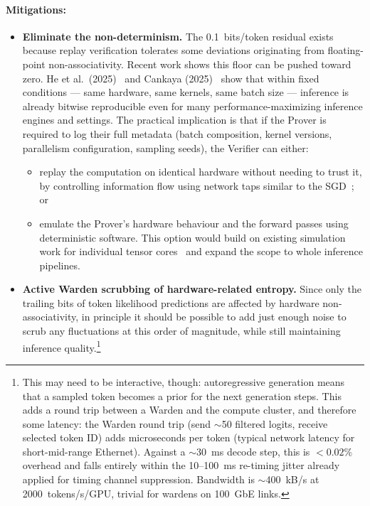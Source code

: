 \documentclass{article}
\begin{document}
\paragraph{Mitigations:}
\begin{itemize}
\item \textbf{Eliminate the non-determinism.} The 0.1~bits/token residual exists because replay verification tolerates some deviations originating from floating-point non-associativity. Recent work shows this floor can be pushed toward zero. He et al.\ (2025)~\cite{he2025defeating} and Cankaya (2025)~\cite{cankaya2025catching1} show that within fixed conditions --- same hardware, same kernels, same batch size --- inference is already bitwise reproducible even for many performance-maximizing inference engines and settings. The practical implication is that if the Prover is required to log their full metadata (batch composition, kernel versions, parallelism configuration, sampling seeds), the Verifier can either:
\begin{itemize}
\item replay the computation on identical hardware without needing to trust it, by controlling information flow using network taps similar to the SGD~\cite{cankaya2026catching2}; or
\item emulate the Prover's hardware behaviour and the forward passes using deterministic software. This option would build on existing simulation work for individual tensor cores~\cite{khattak2025tensorcores} and expand the scope to whole inference pipelines.
\end{itemize}
\item \textbf{Active Warden scrubbing of hardware-related entropy.} Since only the trailing bits of token likelihood predictions are affected by hardware non-associativity, in principle it should be possible to add just enough noise to scrub any fluctuations at this order of magnitude, while still maintaining inference quality.\footnote{This may need to be interactive, though: autoregressive generation means that a sampled token becomes a prior for the next generation steps. This adds a round trip between a Warden and the compute cluster, and therefore some latency: the Warden round trip (send $\sim$50 filtered logits, receive selected token ID) adds microseconds per token (typical network latency for short-mid-range Ethernet). Against a $\sim$30~ms decode step, this is $<0.02\%$ overhead and falls entirely within the 10--100~ms re-timing jitter already applied for timing channel suppression. Bandwidth is $\sim$400~kB/s at 2000~tokens/s/GPU, trivial for wardens on 100~GbE links.}
\end{itemize}
\end{document}
